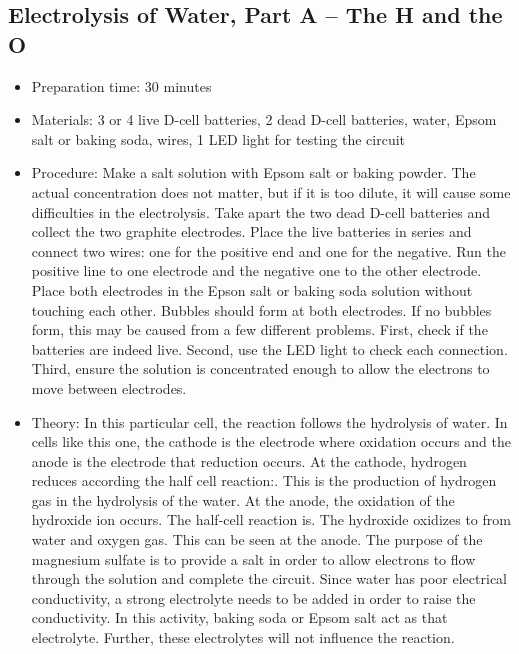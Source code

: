 \subsection{Electrolysis of Water, Part A -- The H and the O}
\begin{itemize}
\item{Preparation time: 30 minutes}
\item{Materials: 3 or 4 live D-cell batteries, 2 dead D-cell batteries, water, Epsom salt or baking soda, wires, 1 LED light for testing the circuit}
\item{Procedure: Make a salt solution with Epsom salt or baking powder. The actual concentration does not matter, but if it is too dilute, it will cause some difficulties in the electrolysis. Take apart the two dead D-cell batteries and collect the two graphite electrodes. Place the live batteries in series and connect two wires: one for the positive end and one for the negative. Run the positive line to one electrode and the negative one to the other electrode. Place both electrodes in the Epson salt or baking soda solution without touching each other. Bubbles should form at both electrodes. If no bubbles form, this may be caused from a few different problems. First, check if the batteries are indeed live. Second, use the LED light to check each connection. Third, ensure the solution is concentrated enough to allow the electrons to move between electrodes.}
\item{Theory: In this particular cell, the reaction follows the hydrolysis of water. In cells like this one, the cathode is the electrode where oxidation occurs and the anode is the electrode that reduction occurs. At the cathode, hydrogen reduces according the half cell reaction:. This is the production of hydrogen gas in the hydrolysis of the water. At the anode, the oxidation of the hydroxide ion occurs. The half-cell reaction is. The hydroxide oxidizes to from water and oxygen gas. This can be seen at the anode. The purpose of the magnesium sulfate is to provide a salt in order to allow electrons to flow through the solution and complete the circuit. Since water has poor electrical conductivity, a strong electrolyte needs to be added in order to raise the conductivity. In this activity, baking soda or Epsom salt act as that electrolyte. Further, these electrolytes will not influence the reaction.}
\end{itemize}

